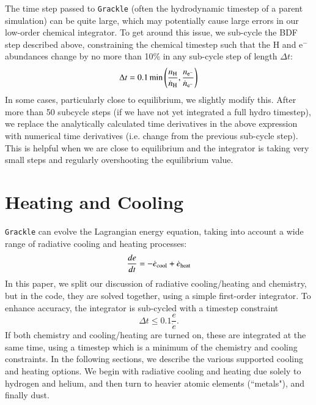 The time step passed to \texttt{Grackle} (often the hydrodynamic timestep of a parent simulation) can be quite large, which may potentially cause large errors in our low-order chemical integrator.  To get around this issue, we sub-cycle the BDF step described above, constraining the chemical timestep such that the H and e$^-$ abundances change by no more than 10\% in any sub-cycle step of length $\Delta t$:
\begin{equation}
\Delta t = 0.1 \min \left( \frac{n_{\rm H}}{\dot{n}_{\rm H}} , \frac{n_{\rm e^-}}{\dot{n}_{\rm e^-}} \right)
\end{equation}
In some cases, particularly close to equilibrium, we slightly modify this.  After more than 50 subcycle steps (if we have not yet integrated a full hydro timestep), we replace the analytically calculated time derivatives in the above expression with numerical time derivatives (i.e. change from the previous sub-cycle step).  This is helpful when we are close to equilibrium and the integrator is taking very small steps and regularly overshooting the equilibrium value.  


\section{Heating and Cooling} \label{Cooling}

\texttt{Grackle} can evolve the Lagrangian energy equation, taking into account a wide range of radiative cooling and heating processes:
\begin{equation}
\frac{de}{dt} = - \dot{e}_{\rm cool} + \dot{e}_{\rm heat}
\end{equation}
In this paper, we split our discussion of radiative cooling/heating and chemistry, but in the code, they are solved together, using a simple first-order integrator.  To enhance accuracy, the integrator is sub-cycled with a timestep constraint 
\begin{equation}
\Delta t \leq 0.1 \frac{e}{\dot{e}}.
\end{equation}
If both chemistry and cooling/heating are turned on, these are integrated at the same time, using a timestep which is a minimum of the chemistry and cooling constraints.  In the following sections, we describe the various supported cooling and heating options.  We begin with radiative cooling and heating due solely to hydrogen and helium, and then turn to heavier atomic elements (``metals"), and finally dust. 

